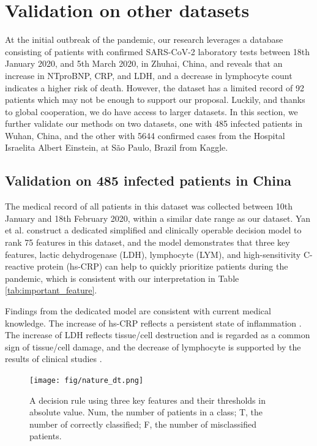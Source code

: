 \clearpage
\section{Validation on other datasets}

At the initial outbreak of the pandemic, our research leverages a database consisting of patients with confirmed SARS-CoV-2 laboratory tests between 18th January 2020, and 5th March 2020, in Zhuhai, China, and reveals that an increase in NTproBNP, CRP, and LDH, and a decrease in lymphocyte count indicates a higher risk of death. However, the dataset has a limited record of 92 patients which may not be enough to support our proposal. Luckily, and thanks to global cooperation, we do have access to larger datasets. In this section, we further validate our methods on two datasets, one with 485 infected patients in Wuhan, China\cite{Yan2020}, and the other with 5644 confirmed cases from the Hospital Israelita Albert Einstein, at São Paulo, Brazil from Kaggle.

\subsection{\textbf{Validation on 485 infected patients in China}}

The medical record of all patients in this dataset was collected between 10th January and 18th February 2020, within a similar date range as our dataset. Yan et al. construct a dedicated simplified and clinically operable decision model to rank 75 features in this dataset, and the model demonstrates that three key features, lactic dehydrogenase (LDH), lymphocyte (LYM), and high-sensitivity C-reactive protein (hs-CRP) can help to quickly prioritize patients during the pandemic, which is consistent with our interpretation in Table \ref{tab:important_feature}.

Findings from the dedicated model are consistent with current medical knowledge. The increase of hs-CRP reflects a persistent state of inflammation \cite{pmid19411291}. The increase of LDH reflects tissue/cell destruction and is regarded as a common sign of tissue/cell damage, and the decrease of lymphocyte is supported by the results of clinical studies \cite{chen2020epidemiological}.

\begin{figure}[H]
\centering
\texttt{[image: fig/nature\_dt.png]}
\caption{A decision rule using three key features and their thresholds in
absolute value. Num, the number of patients in a class; T, the number of
correctly classified; F, the number of misclassified patients. \cite{Yan2020}}
\end{figure}

